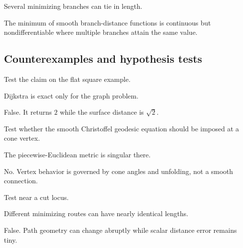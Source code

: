 \begin{hint}
Several minimizing branches can tie in length.
\end{hint}

\begin{solution}
The minimum of smooth branch-distance functions is continuous but nondifferentiable where multiple branches attain the same value.
\end{solution}

\subsection*{Counterexamples and hypothesis tests}

\begin{exercise}\label{exr:vii38-ped-10}
Test the claim on the flat square example.
\end{exercise}

\begin{hint}
Dijkstra is exact only for the graph problem.
\end{hint}

\begin{solution}
False.  It returns \(2\) while the surface distance is \(\sqrt2\).
\end{solution}

\begin{exercise}\label{exr:vii38-ped-11}
Test whether the smooth Christoffel geodesic equation should be imposed at a cone vertex.
\end{exercise}

\begin{hint}
The piecewise-Euclidean metric is singular there.
\end{hint}

\begin{solution}
No.  Vertex behavior is governed by cone angles and unfolding, not a smooth connection.
\end{solution}

\begin{exercise}\label{exr:vii38-ped-12}
Test near a cut locus.
\end{exercise}

\begin{hint}
Different minimizing routes can have nearly identical lengths.
\end{hint}

\begin{solution}
False.  Path geometry can change abruptly while scalar distance error remains tiny.
\end{solution}

